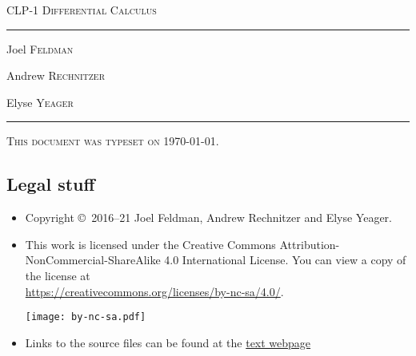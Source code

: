 \documentclass[12pt,a4paper]{book}
\begin{document}
\setcounter{page}{0}

\begin{titlepage}
\begin{center}
\textsc{\LARGE CLP-1 Differential Calculus
}\\[2ex]

\vspace{5ex}
\hrule
\vspace{5ex}

\begin{minipage}[t]{0.3\textwidth} \begin{flushleft}
\large Joel \textsc{Feldman}
\end{flushleft} \end{minipage}%
\begin{minipage}[t]{0.3\textwidth} \begin{flushleft}
\large Andrew \textsc{Rechnitzer}
\end{flushleft} \end{minipage}%
\begin{minipage}[t]{0.3\textwidth} \begin{flushright}
\large Elyse \textsc{Yeager}
\end{flushright} \end{minipage}%
\end{center}
\vspace{2ex}
\hrule

\vfill
\textsc{This document was typeset on \today.}
\end{titlepage}

\subsection*{Legal stuff}
\begin{itemize}
 \item Copyright \copyright\ 2016--21 Joel Feldman, Andrew Rechnitzer and Elyse Yeager.

\item This work is licensed under the
Creative Commons Attribution-NonCommercial-ShareAlike 4.0 International
License. You can view a copy of the license at \\
\url{https://creativecommons.org/licenses/by-nc-sa/4.0/}.
\begin{center}
 \texttt{[image: by-nc-sa.pdf]}
\end{center}


\item Links to the source files can be found at the \href{https://www.math.ubc.ca/~CLP/index.html}{text webpage}
\end{itemize}

\frontmatter


\tableofcontents

\mainmatter

\setcounter{chapter}{-1}





\appendix


\end{document}
